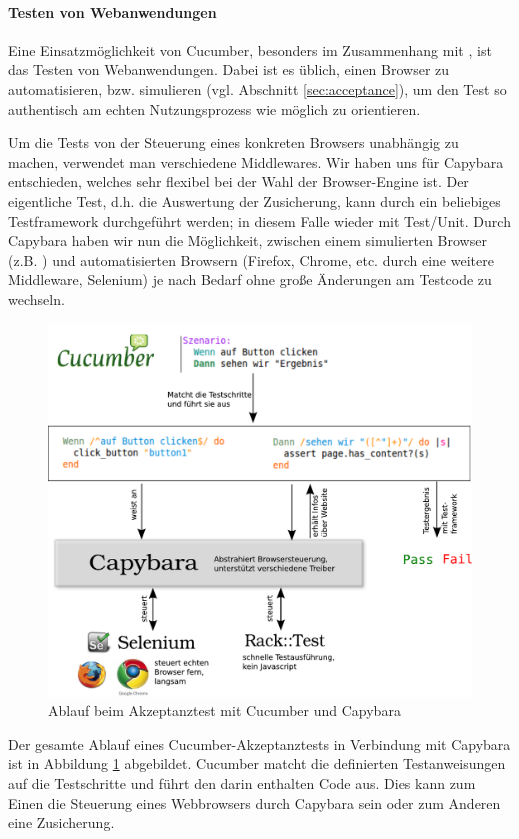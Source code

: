 \paragraph{Testen von Webanwendungen}
Eine Einsatzmöglichkeit von Cucumber, besonders im Zusammenhang mit , ist das Testen von Webanwendungen. Dabei ist es üblich, einen Browser zu automatisieren, bzw. simulieren (vgl. Abschnitt \ref{sec:acceptance}), um den Test so authentisch am echten Nutzungsprozess wie möglich zu orientieren.

Um die Tests von der Steuerung eines konkreten Browsers unabhängig zu machen, verwendet man verschiedene Middlewares. Wir haben uns für Capybara entschieden, welches sehr flexibel bei der Wahl der Browser-Engine ist. Der eigentliche Test, d.h. die Auswertung der Zusicherung, kann durch ein beliebiges Testframework durchgeführt werden; in diesem Falle wieder mit Test/Unit. Durch Capybara haben wir nun die Möglichkeit, zwischen einem simulierten Browser (z.B. \textbf{}) und automatisierten Browsern (Firefox, Chrome, etc. durch eine weitere Middleware, Selenium) je nach Bedarf ohne große Änderungen am Testcode zu wechseln.
\begin{figure}[htbp]
 \centering
 \includegraphics[width=\linewidth]{./diagrams/cucumber.pdf}
 \caption{Ablauf beim Akzeptanztest mit Cucumber und Capybara}
 \label{fig:cucumber}
\end{figure}

Der gesamte Ablauf eines Cucumber-Akzeptanztests in Verbindung mit Capybara ist in Abbildung \ref{fig:cucumber} abgebildet. Cucumber matcht die definierten Testanweisungen auf die Testschritte und führt den darin enthalten Code aus. Dies kann zum Einen die Steuerung eines Webbrowsers durch Capybara sein oder zum Anderen eine Zusicherung.
